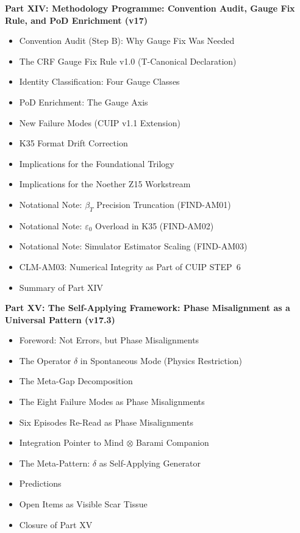 \documentclass[11pt, a4paper]{article}
\begin{document}
\begin{contentsbox}[title={Part C --- Part and Section Headers}]
\textbf{Part XIV: Methodology Programme: Convention Audit, Gauge Fix Rule, and PoD Enrichment (v17)}
\begin{itemize}[noitemsep,leftmargin=1.5em]
  \item Convention Audit (Step B): Why Gauge Fix Was Needed
  \item The CRF Gauge Fix Rule v1.0 (T-Canonical Declaration)
  \item Identity Classification: Four Gauge Classes
  \item PoD Enrichment: The Gauge Axis
  \item New Failure Modes (CUIP v1.1 Extension)
  \item K35 Format Drift Correction
  \item Implications for the Foundational Trilogy
  \item Implications for the Noether Z15 Workstream
  \item Notational Note: $\beta_T$ Precision Truncation (FIND-AM01)
  \item Notational Note: $\varepsilon_0$ Overload in K35 (FIND-AM02)
  \item Notational Note: Simulator Estimator Scaling (FIND-AM03)
  \item CLM-AM03: Numerical Integrity as Part of CUIP STEP~6
  \item Summary of Part XIV
\end{itemize}

\textbf{Part XV: The Self-Applying Framework: Phase Misalignment as a Universal Pattern (v17.3)}
\begin{itemize}[noitemsep,leftmargin=1.5em]
  \item Foreword: Not Errors, but Phase Misalignments
  \item The Operator $\delta$ in Spontaneous Mode (Physics Restriction)
  \item The Meta-Gap Decomposition
  \item The Eight Failure Modes as Phase Misalignments
  \item Six Episodes Re-Read as Phase Misalignments
  \item Integration Pointer to Mind $\otimes$ Barami Companion
  \item The Meta-Pattern: $\delta$ as Self-Applying Generator
  \item Predictions
  \item Open Items as Visible Scar Tissue
  \item Closure of Part XV
\end{itemize}


\end{contentsbox}
\end{document}
